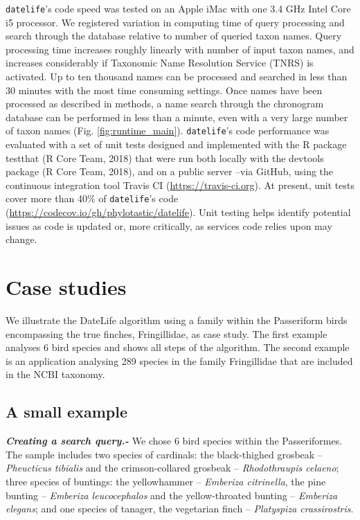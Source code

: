 \documentclass[
  english,
  man]{apa6}
\begin{document}
\texttt{datelife}'s code speed was tested on an Apple iMac
with one 3.4 GHz Intel Core i5 processor.
We registered variation in computing time of query processing and search through the database relative to number of queried taxon names.
Query processing time increases roughly linearly with number of input taxon names, and
increases considerably if Taxonomic Name Resolution Service (TNRS) is activated.
Up to ten thousand names can be processed and searched in less than 30 minutes with the most time consuming settings.
Once names have been processed as described in methods, a name search through the chronogram database can be performed in less than a minute, even with a very large number of taxon names (Fig. \ref{fig:runtime_main}).
\texttt{datelife}'s code performance was evaluated with a set of unit tests designed and
implemented with the R package testthat (R Core Team, 2018) that were run both locally
with the devtools package (R Core Team, 2018), and on a public server --via
GitHub, using the continuous integration tool Travis CI (\url{https://travis-ci.org}). At
present, unit tests cover more than 40\% of \texttt{datelife}'s code (\url{https://codecov.io/gh/phylotastic/datelife}).
Unit testing helps identify potential issues as code is updated or, more critically, as services code relies upon may change.

\hypertarget{case-studies}{%
\section{Case studies}\label{case-studies}}

We illustrate the DateLife algorithm using a family within the Passeriform birds encompassing the true finches, Fringillidae, as case study. The first example analyses 6 bird species and shows all steps of the algorithm. The second example is an application analysing 289 species in the family Fringillidae that are included in the NCBI taxonomy.

\hypertarget{a-small-example}{%
\subsection{A small example}\label{a-small-example}}

\emph{\textbf{Creating a search query.-}}
We chose 6 bird species within the Passeriformes. The sample includes
two species of cardinals:
the black-thighed grosbeak -- \emph{Pheucticus tibialis} and
the crimson-collared grosbeak -- \emph{Rhodothraupis celaeno};
three species of buntings:
the yellowhammer -- \emph{Emberiza citrinella},
the pine bunting -- \emph{Emberiza leucocephalos} and
the yellow-throated bunting -- \emph{Emberiza elegans};
and one species of tanager, the vegetarian finch -- \emph{Platyspiza crassirostris}.
\end{document}
